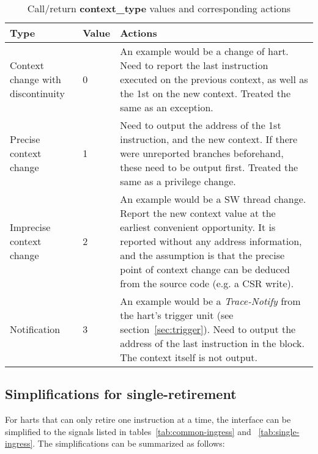 \begin{table}[htp]
    \centering
    \caption{Call/return \textbf{context\_type} values and corresponding actions}
    \label{tab:context-type}
    \begin{tabulary}{\textwidth}{|l|l|p{80mm}|}
        \hline
        \textbf {Type} & \textbf {Value} & \textbf {Actions} \\
        \hline
        Context change with discontinuity & 0 &  An example would be a change of hart.\newline
        Need to report the last instruction executed on the previous context, as well as the 1st on the new context.\newline
        Treated the same as an exception.\\
        \hline
        Precise context change & 1 & Need to output the address of the 1st instruction, and the new context.\newline
        If there were unreported branches beforehand, these need to be output first.\newline
        Treated the same as a privilege change.\\
        \hline
        Imprecise context change & 2 & An example would be a SW thread change.\newline
        Report the new context value at the earliest convenient opportunity.\newline
        It is reported without any address information, and the assumption is that the precise point of context change can be deduced from the source code (e.g. a CSR write). \\
        \hline
        Notification & 3 & An example would be a \textit{Trace-Notify} from the hart's trigger unit (see section~\ref{sec:trigger}).\newline
        Need to output the address of the last instruction in the block.\newline
        The context itself is not output.\\
        \hline
    \end{tabulary}
\end{table}

\subsection{Simplifications for single-retirement} \label{sec:single-retire}

For harts that can only retire one instruction at a time, the interface can be simplified to
the signals listed in tables~\ref{tab:common-ingress} and ~\ref{tab:single-ingress}.  The 
simplifications can be summarized as follows:
 
